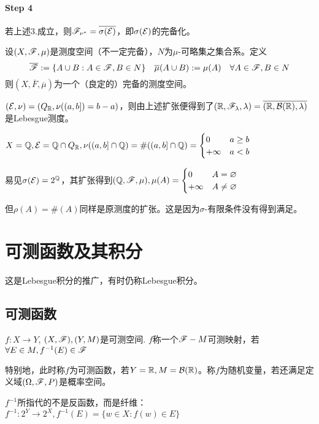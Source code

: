\documentclass{ctexart}
\begin{document}
\paragraph{Step 4}
\begin{Thm}
  若上述3.成立，则$\mathscr{F}_{\nu^{*}}=\overline{\sigma(\mathcal{E})}$，即$\sigma(\mathcal{E})$的完备化。
\end{Thm}

\begin{Thm}[完备化定理]
  设$(X,\mathscr{F},\mu)$是测度空间（不一定完备），$N$为$\mu$-可略集之集合系。定义
  \[\overline{\mathscr{F}}:=\{A\cup B:A\in\mathscr{F}, B\in N\}\quad  \overline{\mu}(A\cup B):=\mu(A)\quad\forall A\in\mathscr{F}, B\in N\]
  则$(X,\overline{F},\overline{\mu})$为一个（良定的）完备的测度空间。
\end{Thm}

\begin{comment}
\begin{Prop}
  $(\E,\nu)$是半环及其上的预测度，则$\nu^{*}|_{\E}=\nu$。
\end{Prop}
\end{comment}

\begin{Eg}
  $(\mathcal{E},\nu)=(Q_{\mathbb{R}},\nu((a,b])=b-a)$，则由上述扩张便得到了$(\mathbb{R},\mathscr{F}_{\lambda},\lambda)=\overline{(\mathbb{R},\mathcal{B}(\mathbb{R}),\lambda)}$是Lebesgue测度。
\end{Eg}

\begin{Eg}
  $X=\mathbb{Q}, \mathcal{E}=\mathbb{Q}\cap Q_{\mathbb{R}},\nu((a,b]\cap \mathbb{Q})=\#((a,b]\cap\mathbb{Q})=
  \begin{cases}
    0& a\geq b\\+\infty&a<b
  \end{cases}  $

  易见$\sigma(\mathcal{E})=2^{\mathbb{Q}}$，其扩张得到$(\mathbb{Q},\mathscr{F},\mu),\mu(A)=
  \begin{cases}
    0&A=\varnothing\\+\infty &A\neq\varnothing
  \end{cases}  $

  但$\rho(A)=\#(A)$同样是原测度的扩张。这是因为$\sigma$-有限条件没有得到满足。
\end{Eg}

\section{可测函数及其积分}

这是Lebesgue积分的推广，有时仍称Lebesgue积分。
\subsection{可测函数}
\begin{Def}[可测映射]
  $f:X\to Y$, $(X,\mathscr{F}),(Y,M)$是可测空间. $f$称一个$\mathscr{F}-M$可测映射，若$\forall E\in M, f^{-1}(E)\in\mathscr{F}$

  特别地，此时称$f$为可测函数，若$Y=\mathbb{R},M=\mathcal{B}(\mathbb{R})$。称$f$为随机变量，若还满足定义域$(\Omega, \mathscr{F},P)$是概率空间。
\end{Def}
\begin{Rmk}
  $f^{-1}$所指代的不是反函数，而是纤维：$f^{-1}:2^{Y}\to 2^{X},f^{-1}(E)=\{w\in X:f(w)\in E\}$
\end{Rmk}
\end{document}
